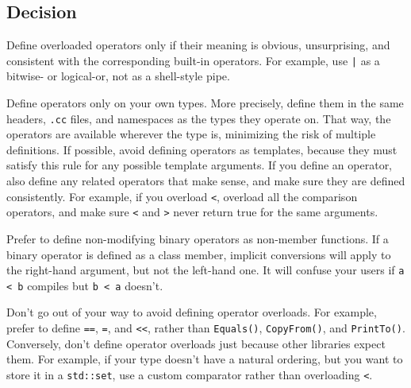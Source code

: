 \subsection{Decision}
Define overloaded operators only if their meaning is obvious, unsurprising, and consistent with the corresponding built-in operators. For example, use \texttt{|} as a bitwise- or logical-or, not as a shell-style pipe.

Define operators only on your own types. More precisely, define them in the same headers, \texttt{.cc} files, and namespaces as the types they operate on. That way, the operators are available wherever the type is, minimizing the risk of multiple definitions. If possible, avoid defining operators as templates, because they must satisfy this rule for any possible template arguments. If you define an operator, also define any related operators that make sense, and make sure they are defined consistently. For example, if you overload \texttt{<}, overload all the comparison operators, and make sure \texttt{<} and \texttt{>} never return true for the same arguments.

Prefer to define non-modifying binary operators as non-member functions. If a binary operator is defined as a class member, implicit conversions will apply to the right-hand argument, but not the left-hand one. It will confuse your users if \texttt{a < b} compiles but \texttt{b < a} doesn't.

Don't go out of your way to avoid defining operator overloads. For example, prefer to define \texttt{==}, \texttt{=}, and \texttt{<<}, rather than \texttt{Equals()}, \texttt{CopyFrom()}, and \texttt{PrintTo()}. Conversely, don't define operator overloads just because other libraries expect them. For example, if your type doesn't have a natural ordering, but you want to store it in a \texttt{std::set}, use a custom comparator rather than overloading \texttt{<}.

